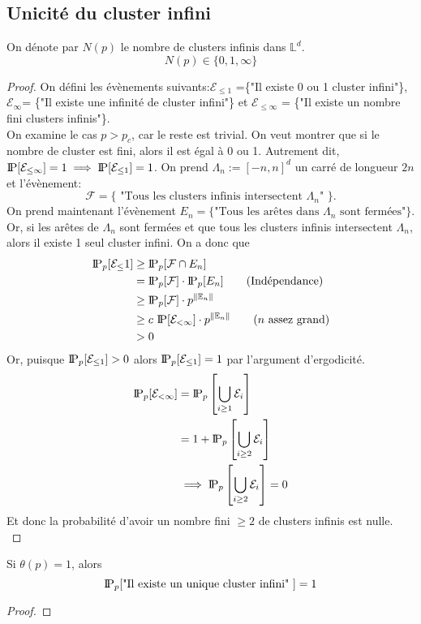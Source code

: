 \subsection{Unicité du cluster infini}
\begin{theorem}On dénote par $N(p)$ le nombre de clusters infinis dans $\mathbb{L}^d$.\\
    \begin{equation}
        N(p) \in \{0,1,\infty\}
    \end{equation}
\end{theorem}
\begin{proof}
    On défini les évènements suivants:$\mathcal{E}_{\leq1}$ =\{"Il existe 0 ou 1 cluster infini"\}, $\mathcal{E}_{\infty}$= \{"Il existe une infinité de cluster infini"\} et $\mathcal{E}_{\leq \infty}$ = \{"Il existe un nombre fini clusters infinis"\}.\\ On examine le cas $p>p_c$, car le reste est trivial. On veut montrer que si le nombre de cluster est fini, alors il est égal à 0 ou 1.
    Autrement dit, $\text{I\kern-0.15em P}[\mathcal{E}_{\leq \infty}] = 1 \implies \text{I\kern-0.15em P}[\mathcal{E}_{\leq1}] = 1 $. On prend $\Lambda_n:=[-n,n]^d$ un carré de longueur $2n$ et l'évènement:$$
    \mathcal{F}=\{\text{ "Tous les clusters infinis intersectent $\Lambda_n$" \}}.
    $$  On prend maintenant l'évènement $E_n=\{\text{"Tous les arêtes dans $\Lambda_n$ sont fermées"\}}$. Or, si les arêtes de $\Lambda_n$ sont fermées et que tous les clusters infinis intersectent $\Lambda_n$, alors il existe 1 seul cluster infini.
    On a donc que 
    \begin{align*}
        \text{I\kern-0.15em P}_p[\mathcal{E}_\leq1] &\geq \text{I\kern-0.15em P}_p[\mathcal{F} \cap E_n]\\
                                    &=\text{I\kern-0.15em P}_p[\mathcal{F}]\cdot\text{I\kern-0.15em P}_p[E_n]\tag{Indépendance}\\ 
                                    &\geq \text{I\kern-0.15em P}_p[\mathcal{F}] \cdot p^{\lVert \mathbb{E}_n \rVert}\\ 
                                    &\geq c \text{ }\text{I\kern-0.15em P}[\mathcal{E}_{<\infty}]\cdot p^{\lVert \mathbb{E}_n \rVert}\tag{$n$ assez grand}\\
                                    &>0
    \end{align*}
    Or, puisque $\text{I\kern-0.15em P}_p[\mathcal{E}_{\leq1}] > 0$ alors $\text{I\kern-0.15em P}_p[\mathcal{E}_{\leq1}] = 1$ par l'argument d'ergodicité. 
    \begin{align*}
        \text{I\kern-0.15em P}_p[\mathcal{E_{<\infty}}] &= \text{I\kern-0.15em P}_p\left[\bigcup_{i\geq1}\mathcal{E}_{i}\right]\\
                                        &= 1 + \text{I\kern-0.15em P}_p\left[\bigcup_{i\geq2}\mathcal{E}_{i}\right]\\
                                        &\implies \text{I\kern-0.15em P}_p\left[\bigcup_{i\geq2}\mathcal{E}_{i}\right] = 0
    \end{align*}
    Et donc la probabilité d'avoir un nombre fini $\geq2$ de clusters infinis est nulle.\\
\end{proof}
\begin{theorem}
    Si $\theta(p) =1 $, alors
    $$
    \text{I\kern-0.15em P}_p[\text{"Il existe un unique cluster infini" }] = 1
    $$
    
\end{theorem}
\begin{proof}    
\end{proof}
